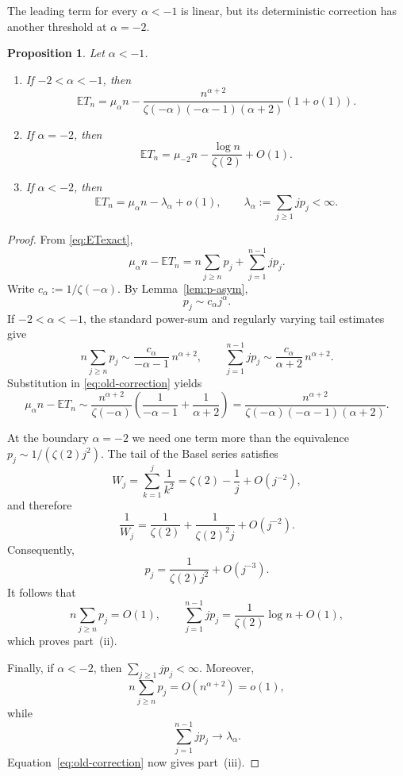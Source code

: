 \documentclass[11pt,a4paper]{article}
\newtheorem{proposition}[theorem]{Proposition}
\newcommand{\E}{\mathbb{E}}
\newcommand{\1}{\mathbf{1}}
\begin{document}
The leading term for every $\alpha<-1$ is linear, but its deterministic
correction has another threshold at $\alpha=-2$.

\begin{proposition}\label{prop:old-second}
Let $\alpha<-1$.
\begin{enumerate}[label=(\roman*)]
\item If $-2<\alpha<-1$, then
\[
\E T_n
=
\mu_\alpha n
-
\frac{n^{\alpha+2}}
{\zeta(-\alpha)(-\alpha-1)(\alpha+2)}
(1+o(1)).
\]

\item If $\alpha=-2$, then
\[
\E T_n
=
\mu_{-2}n
-
\frac{\log n}{\zeta(2)}
+O(1).
\]

\item If $\alpha<-2$, then
\[
\E T_n
=
\mu_\alpha n-\lambda_\alpha+o(1),
\qquad
\lambda_\alpha:=\sum_{j\ge1}jp_j<\infty.
\]
\end{enumerate}
\end{proposition}

\begin{proof}
From \eqref{eq:ETexact},
\begin{equation}\label{eq:old-correction}
\mu_\alpha n-\E T_n
=
n\sum_{j\ge n}p_j
+
\sum_{j=1}^{n-1}jp_j.
\end{equation}
Write $c_\alpha:=1/\zeta(-\alpha)$.  By
Lemma~\ref{lem:p-asym},
\[
p_j\sim c_\alpha j^\alpha.
\]
If $-2<\alpha<-1$, the standard power-sum and regularly varying tail
estimates give
\[
n\sum_{j\ge n}p_j
\sim
\frac{c_\alpha}{-\alpha-1}\,n^{\alpha+2},
\qquad
\sum_{j=1}^{n-1}jp_j
\sim
\frac{c_\alpha}{\alpha+2}\,n^{\alpha+2}.
\]
Substitution in \eqref{eq:old-correction} yields
\[
\mu_\alpha n-\E T_n
\sim
\frac{n^{\alpha+2}}{\zeta(-\alpha)}
\left(
\frac1{-\alpha-1}+\frac1{\alpha+2}
\right)
=
\frac{n^{\alpha+2}}
{\zeta(-\alpha)(-\alpha-1)(\alpha+2)}.
\]

At the boundary $\alpha=-2$ we need one term more than the equivalence
$p_j\sim 1/(\zeta(2)j^2)$.  The tail of the Basel series satisfies
\[
W_j
=
\sum_{k=1}^j\frac1{k^2}
=
\zeta(2)-\frac1j+O(j^{-2}),
\]
and therefore
\[
\frac1{W_j}
=
\frac1{\zeta(2)}
+
\frac1{\zeta(2)^2j}
+
O(j^{-2}).
\]
Consequently,
\[
p_j
=
\frac1{\zeta(2)j^2}+O(j^{-3}).
\]
It follows that
\[
n\sum_{j\ge n}p_j=O(1),
\qquad
\sum_{j=1}^{n-1}jp_j
=
\frac1{\zeta(2)}\log n+O(1),
\]
which proves part~(ii).

Finally, if $\alpha<-2$, then
$\sum_{j\ge1}jp_j<\infty$.  Moreover,
\[
n\sum_{j\ge n}p_j
=
O(n^{\alpha+2})=o(1),
\]
while
\[
\sum_{j=1}^{n-1}jp_j
\longrightarrow
\lambda_\alpha.
\]
Equation~\eqref{eq:old-correction} now gives part~(iii).
\end{proof}
\end{document}
